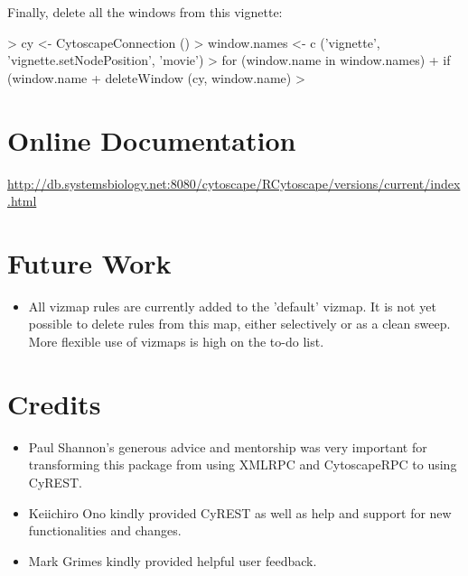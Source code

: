 \documentclass[12pt]{article}
\begin{document}
Finally, delete all the windows from this vignette:

\begin{Schunk}
\begin{Sinput}
>   cy <- CytoscapeConnection ()
>   window.names <- c ('vignette', 'vignette.setNodePosition', 'movie')
>   for (window.name in window.names)
+     if (window.name %in% as.character (getWindowList (cy)))
+       deleteWindow (cy, window.name)
> 
\end{Sinput}
\end{Schunk}
\section{Online Documentation}

 \url{http://db.systemsbiology.net:8080/cytoscape/RCytoscape/versions/current/index.html}


\section{Future Work}

\begin{itemize}

\item All vizmap rules are currently added to the 'default' vizmap.  It is not yet possible to delete rules from this map, either selectively or as a clean sweep.  More flexible use of vizmaps is high on the to-do list.

\end{itemize}

\section{Credits}



\begin{itemize}

\item Paul Shannon's generous advice and mentorship was very important for transforming this package from using XMLRPC and CytoscapeRPC to using CyREST.

\item Keiichiro Ono kindly provided CyREST as well as help and support for new functionalities and changes.

\item Mark Grimes kindly provided helpful user feedback.


\end{itemize}
\end{document}
